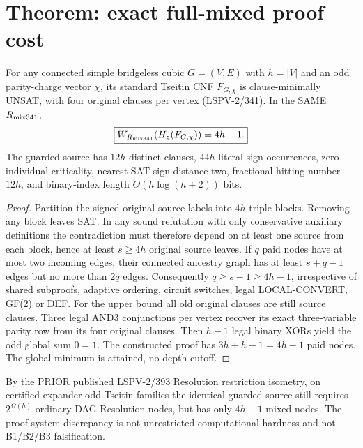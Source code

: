 \documentclass[11pt]{article}
\begin{document}
\section*{Theorem: exact full-mixed proof cost}
For any connected simple bridgeless cubic $G=(V,E)$ with $h=|V|$ and an odd parity-charge vector $\chi$, its standard Tseitin CNF $F_{G,\chi}$ is clause-minimally UNSAT, with four original clauses per vertex (LSPV-2/341). In the SAME $R_{\rm mix341}$,
\[
\boxed{W_{R_{\rm mix341}}(H_z(F_{G,\chi}))=4h-1.}
\]
The guarded source has $12h$ distinct clauses, $44h$ literal sign occurrences, zero individual criticality, nearest SAT sign distance two, fractional hitting number $12h$, and binary-index length $\Theta(h\log(h+2))$ bits.
\begin{proof}
Partition the signed original source labels into $4h$ triple blocks. Removing any block leaves SAT. In any sound refutation with only conservative auxiliary definitions the contradiction must therefore depend on at least one source from each block, hence at least $s\ge4h$ original source leaves. If $q$ paid nodes have at most two incoming edges, their connected ancestry graph has at least $s+q-1$ edges but no more than $2q$ edges. Consequently $q\ge s-1\ge4h-1$, irrespective of shared subproofs, adaptive ordering, circuit switches, legal LOCAL-CONVERT, GF(2) or DEF. For the upper bound all old original clauses are still source clauses. Three legal AND3 conjunctions per vertex recover its exact three-variable parity row from its four original clauses. Then $h-1$ legal binary XORs yield the odd global sum $0=1$. The constructed proof has $3h+h-1=4h-1$ paid nodes. The global minimum is attained, no depth cutoff.
\end{proof}
By the PRIOR published LSPV-2/393 Resolution restriction isometry, on certified expander odd Tseitin families the identical guarded source still requires $2^{\Omega(h)}$ ordinary DAG Resolution nodes, but has only $4h-1$ mixed nodes. The proof-system discrepancy is not unrestricted computational hardness and not B1/B2/B3 falsification.
\end{document}
